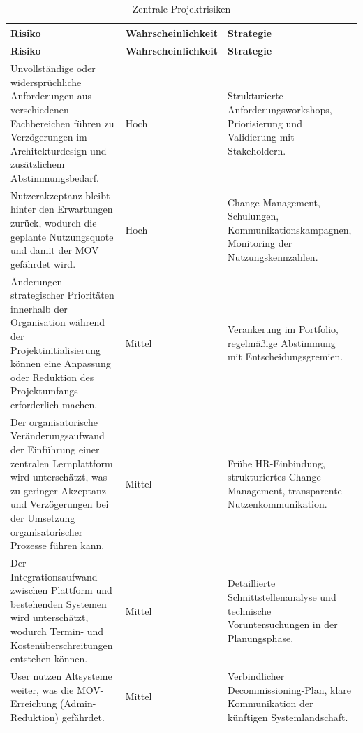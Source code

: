 \begin{xltabular}{\textwidth}{@{}>{\hsize}X>{\hsize}X>{\hsize}X@{}}
    \caption{Zentrale Projektrisiken} \label{tab:risiken} \\
    \hline
    \textbf{Risiko} & \textbf{Wahr\-schein\-lich\-keit} & \textbf{Strategie} \\
    \hline
    \endfirsthead

    \hline
    \textbf{Risiko} & \textbf{Wahrscheinlich\-keit} & \textbf{Strategie} \\
    \hline
    \endhead

    \hline
    \endfoot

    Unvollständige oder widersprüchliche Anforderungen aus verschiedenen
    Fachbereichen führen zu Verzögerungen im Architekturdesign und
    zusätzlichem Abstimmungsbedarf. &
    Hoch &
    Strukturierte Anforderungsworkshops, Priorisierung und Validierung mit Stakeholdern. \\

    Nutzerakzeptanz bleibt hinter den Erwartungen zurück,
    wodurch die geplante Nutzungsquote und damit der \acs{MOV}
    gefährdet wird. &
    Hoch &
    Change-Management, Schulungen, Kommunikationskampagnen, Monitoring der Nutzungskennzahlen. \\

    Änderungen strategischer Prioritäten innerhalb der
    Organisation während der Projektinitialisierung können
    eine Anpassung oder Reduktion des Projektumfangs
    erforderlich machen. &
    Mittel &
    Verankerung im Portfolio, regelmäßige Abstimmung mit Entscheidungsgremien. \\

    Der organisatorische Veränderungsaufwand der Einführung
    einer zentralen Lernplattform wird unterschätzt,
    was zu geringer Akzeptanz und Verzögerungen bei der
    Umsetzung organisatorischer Prozesse führen kann. &
    Mittel &
    Frühe \acs{HR}-Einbindung, strukturiertes Change-Management, transparente Nutzenkommunikation. \\

    Der Integrationsaufwand zwischen Plattform und bestehenden
    Systemen wird unterschätzt, wodurch Termin- und
    Kostenüberschreitungen entstehen können. &
    Mittel &
    Detaillierte Schnittstellenanalyse und technische Voruntersuchungen in der Planungsphase. \\

    User nutzen Altsysteme weiter, was die \acs{MOV}-Erreichung
    (Admin-Reduktion) gefährdet. &
    Mittel &
    Verbindlicher Decommissioning-Plan, klare Kommunikation der künftigen Systemlandschaft. \\
\end{xltabular}
